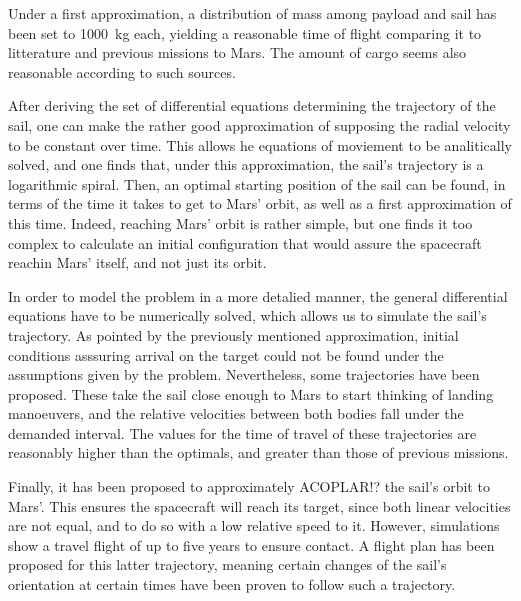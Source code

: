 \documentclass[twocolumn,12pt,a4paper]{article}
\numberwithin{equation}{section}
\begin{document}
Under a first approximation, a distribution of mass among payload and sail has been set to \SI{1000}{kg} each, yielding a reasonable time of flight comparing it to litterature and previous missions to Mars. The amount of cargo seems also reasonable according to such sources.

After deriving the set of differential equations determining the trajectory of the sail, one can make the rather good approximation of supposing the radial velocity to be constant over time. This allows he equations of moviement to be analitically solved, and one finds that, under this approximation, the sail's trajectory is a logarithmic spiral. Then, an optimal starting position of the sail can be found, in terms of the time it takes to get to Mars' orbit, as well as a first approximation of this time. Indeed, reaching Mars' orbit is rather simple, but one finds it too complex to calculate an initial configuration that would assure the spacecraft reachin Mars' itself, and not just its orbit.  

In order to model the problem in a more detalied manner, the general differential equations have to be numerically solved, which allows us to simulate the sail's trajectory. As pointed by the previously mentioned approximation, initial conditions asssuring arrival on the target could not be found under the assumptions given by the problem. Nevertheless, some trajectories have been proposed. These take the sail close enough to Mars to start thinking of landing manoeuvers, and the relative velocities between both bodies fall under the demanded interval. The values for the time of travel of these trajectories are reasonably higher than the optimals, and greater than those of previous missions.

Finally, it has been proposed to approximately ACOPLAR!? the sail's orbit to Mars'. This ensures the spacecraft will reach its target, since both linear velocities are not equal, and to do so with a low relative speed to it. However, simulations show a travel flight of up to five years to ensure contact. A flight plan has been proposed for this latter trajectory, meaning certain changes of the sail's orientation at certain times have been proven to follow such a trajectory.  
\end{document}
